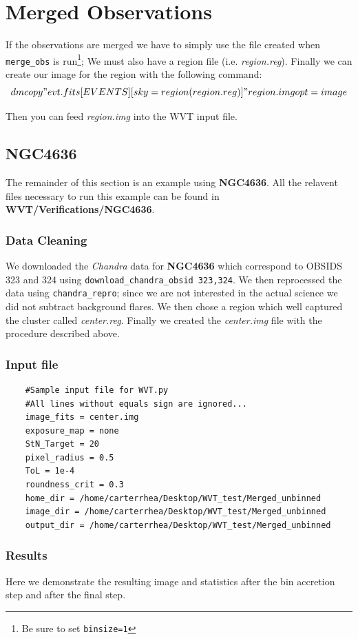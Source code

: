 \documentclass[11pt,letterpaper]{article}
\begin{document}
\section{Merged Observations}
If the observations are merged we have to simply use the file created when \texttt{merge\_obs} is run\footnote{Be sure to set \texttt{binsize=1}}; We must also have a region file (i.e. \textit{region.reg}). Finally we can create our image for the region with the following command:
$$dmcopy "evt.fits[EVENTS][sky=region(region.reg)]" region.img opt=image$$ 

Then you can feed \textit{region.img} into the WVT input file.

\subsection{\textbf{NGC4636}}
The remainder of this section is an example using \textbf{NGC4636}. All the relavent files necessary to run this example can be found in \textbf{WVT/Verifications/NGC4636}.
\subsubsection{Data Cleaning}
We downloaded the \textit{Chandra} data for \textbf{NGC4636} which correspond to OBSIDS 323 and 324 using \texttt{download\_chandra\_obsid 323,324}. We then reprocessed the data using \texttt{chandra\_repro}; since we are not interested in the actual science we did not subtract background flares. We then chose a region which well captured the cluster called \textit{center.reg}. Finally we created the \textit{center.img} file with the procedure described above. 
\subsubsection{Input file}
\begin{lstlisting}
	#Sample input file for WVT.py
	#All lines without equals sign are ignored...
	image_fits = center.img
	exposure_map = none
	StN_Target = 20
	pixel_radius = 0.5
	ToL = 1e-4
	roundness_crit = 0.3
	home_dir = /home/carterrhea/Desktop/WVT_test/Merged_unbinned
	image_dir = /home/carterrhea/Desktop/WVT_test/Merged_unbinned
	output_dir = /home/carterrhea/Desktop/WVT_test/Merged_unbinned
\end{lstlisting}
\subsubsection{Results}
Here we demonstrate the resulting image and statistics after the bin accretion step and after the final step.
\end{document}
